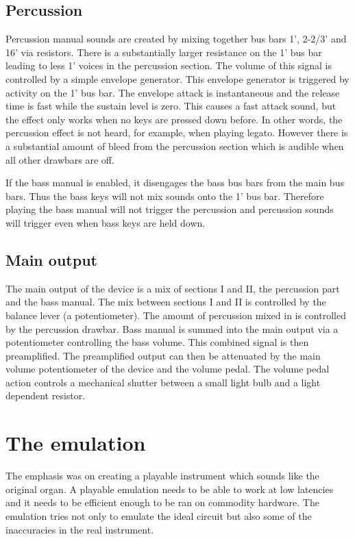 \documentclass[11pt,a4paper]{article}
\begin{document}
\subsection{Percussion}

Percussion manual sounds are created by mixing together bus bars 1', 2-2/3' and 16' via resistors. There is a substantially larger resistance on the 1' bus bar leading to less 1' voices in the percussion section. The volume of this signal is controlled by a simple envelope generator. This envelope generator is triggered by activity on the 1' bus bar. The envelope attack is instantaneous and the release time is fast while the sustain level is zero. This causes a fast attack sound, but the effect only works when no keys are pressed down before. In other words, the percussion effect is not heard, for example, when playing legato. However there is a substantial amount of bleed from the percussion section which is audible when all other drawbars are off.

If the bass manual is enabled, it disengages the bass bus bars from the main bus bars. Thus the bass keys will not mix sounds onto the 1' bus bar. Therefore playing the bass manual will not trigger the percussion and percussion sounds will trigger even when bass keys are held down.

\subsection{Main output}

The main output of the device is a mix of sections I and II, the percussion part and the bass manual. The mix between sections I and II is controlled by the balance lever (a potentiometer). The amount of percussion mixed in is controlled by the percussion drawbar. Bass manual is summed into the main output via a potentiometer controlling the bass volume. This combined signal is then preamplified. The preamplified output can then be attenuated by the main volume potentiometer of the device and the volume pedal. The volume pedal action controls a mechanical shutter between a small light bulb and a light dependent resistor.

\section{The emulation} 

The emphasis was on creating a playable instrument which sounds like the original organ. A playable emulation needs to be able to work at low latencies and it needs to be efficient enough to be ran on commodity hardware. The emulation tries not only to emulate the ideal circuit but also some of the inaccuracies in the real instrument. 
\end{document}
